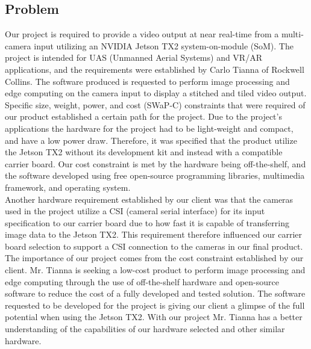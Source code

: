 \subsection{Problem}

Our project is required to provide a video output at near real-time from a 
multi-camera input utilizing an NVIDIA Jetson TX2 system-on-module (SoM). 
The project is intended for UAS (Unmanned Aerial Systems) and VR/AR applications, 
and the requirements were established by Carlo Tianna of Rockwell Collins. 
The software produced is requested to perform image processing and edge computing on the 
camera input to display a stitched and tiled video output.  \\

Specific size, weight, power, and cost (SWaP-C) constraints that were required of our 
product established a certain path for the project. Due to the project's applications  
the hardware for the project had to be light-weight and compact, and have a low power 
draw. Therefore, it was specified that the product utilize the Jetson TX2 without its 
development kit and instead with a compatible carrier board. Our cost constraint is 
met by the hardware being off-the-shelf, and the software developed using free 
open-source programming libraries, multimedia framework, and operating system.  \\

Another hardware requirement established by our client was that the cameras used in
the project utilize a CSI (cameral serial interface) for its input specification to our 
carrier board due to how fast it is capable of transferring image data to the Jetson TX2. 
This requirement therefore influenced our carrier board selection to support a CSI 
connection to the cameras in our final product.  \\

The importance of our project comes from the cost constraint established by our client. 
Mr. Tianna is seeking a low-cost product to perform image processing and edge computing 
through the use of off-the-shelf hardware and open-source software to reduce the cost 
of a fully developed and tested solution. The software requested to be developed for 
the project is giving our client a glimpse of the full potential when using the Jetson 
TX2. With our project Mr. Tianna has a better understanding of the capabilities of our 
hardware selected and other similar hardware.  \\

